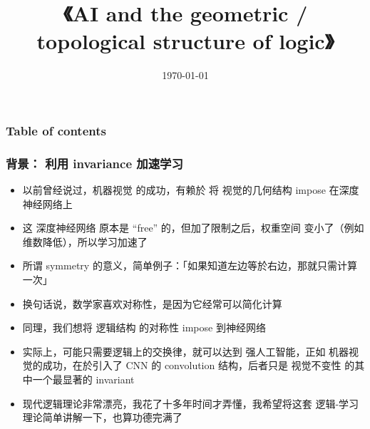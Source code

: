 \documentclass[16pt]{beamer}
\title[Structure of logic once more]{\cc{再谈一次 AI 的逻辑／几何／拓扑结构}
{\Huge《AI and the geometric / topological structure of logic》}}
\author{\cc{YKY 甄景贤}{YKY}} %
\date{\today} %
\makeatletter
\newcommand{\emp}[1]{{\color{violet}#1}}
\newcommand{\smiley}{$\vcenter{\hbox{\texttt{[image: ../smiling-face.png]}}}$}
\newif\ifframeinlbf
\newcommand\listofframes{\@starttoc{lbf}}
\makeatother
\begin{document}
\frameinlbffalse
\addtocounter{page}{-1}
\begin{frame}
\titlepage
\end{frame}

\addtocounter{page}{-1}
\begin{frame}[noframenumbering]
\frametitle{Table of contents}
\listofframes
\end{frame}



\frameinlbftrue

%	

\begin{frame}
\frametitle{背景： 利用 invariance 加速学习}
\begin{itemize}
	\item 以前曾经说过，机器视觉 的成功，有赖於 将 视觉的几何结构 impose 在深度神经网络上
	\item 这 深度神经网络 原本是 ``free'' 的，但加了限制之后，权重空间 变小了（例如维数降低），所以学习加速了
	\item 所谓 symmetry 的意义，简单例子：「如果知道左边等於右边，那就只需计算一次」
	\item 换句话说，数学家喜欢对称性，是因为它经常可以简化计算
	\item 同理，我们想将 逻辑结构 的对称性 impose 到神经网络
	\item 实际上，可能只需要逻辑上的交换律，就可以达到 强人工智能，正如 机器视觉的成功，在於引入了 CNN 的 convolution 结构，后者只是 视觉不变性 的其中一个最显著的 invariant
	\item 现代逻辑理论非常漂亮，我花了十多年时间才弄懂，我希望将这套 逻辑-学习 理论简单讲解一下，也算功德完满了
\end{itemize}
\end{frame}
\end{document}
